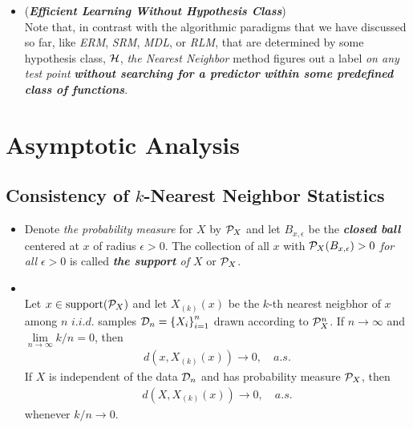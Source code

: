 \documentclass[11pt]{article}
\begin{document}
\begin{itemize}
\item \begin{remark} (\emph{\textbf{Efficient Learning Without Hypothesis Class}}) \citep{shalev2014understanding}\\
Note that, in contrast with the algorithmic paradigms that we have discussed so far, like \emph{ERM}, \emph{SRM}, \emph{MDL}, or \emph{RLM}, that are determined by some hypothesis class, ${\mathcal H}$, \emph{the Nearest Neighbor} method figures out a label \emph{on any test point} \emph{\textbf{without searching for a predictor} \textbf{within some predefined class of functions}}.
\end{remark}
\end{itemize}


\section{Asymptotic Analysis}
\subsection{Consistency of $k$-Nearest Neighbor Statistics}
\begin{itemize}
\item \begin{definition}
Denote \emph{the probability measure} for $X$ by ${\mathcal P}_{X}$ and let $B_{x, \epsilon}$ be the \emph{\textbf{closed ball}} centered at $x$ of radius $\epsilon > 0$. The collection of all $x$ with ${\mathcal P}_{X}(B_{x ,\epsilon}) > 0$ \emph{for all} $\epsilon > 0$ is called \emph{\textbf{the support} of $X$} or ${\mathcal P}_{X}$.
\end{definition}

\item \begin{lemma}\citep{devroye2013probabilistic}\\
Let $x \in \text{support}({\mathcal P}_{X})$ and let $X_{(k)}(x)$ be the $k$-th nearest neigbhor of $x$ among $n$ $i.i.d.$ samples ${\mathcal D}_n= \left\{X_i\right\}_{i=1}^{n}$ drawn according to ${\mathcal P}_{X}^{n}$. If $n\rightarrow \infty$ and $\lim\limits_{n\rightarrow \infty}k/n = 0$, then 
\begin{align*}
d(x,X_{(k)}(x)) \rightarrow 0, \quad a.s.
\end{align*} 
If $X$ is independent of the data ${\mathcal D}_n$ and has probability measure ${\mathcal P}_{X}$, then 
\begin{align*}
d(X, X_{(k)}(x)) \rightarrow 0, \quad a.s.
\end{align*}   whenever $k/n \rightarrow 0$.
\end{lemma}
\end{itemize}
\end{document}
